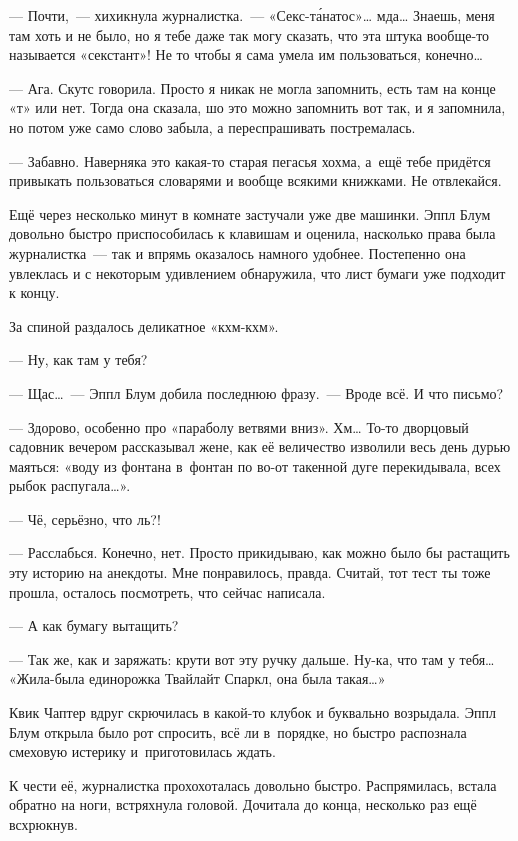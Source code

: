 \documentclass[fontsize=11pt,a5paper,titlepage=firstcover]{scrbook}
\begin{document}
--- Почти,~--- хихикнула журналистка.~--- «Секс-та́натос»{\ldots} мда{\ldots} Знаешь, меня там хоть и не было, но я тебе даже так могу сказать, что эта штука вообще-то называется «секстант»! Не то чтобы я сама умела им пользоваться, конечно{\ldots}

--- Ага. Скутс говорила. Просто я никак не могла запомнить, есть там на конце «т» или нет. Тогда она сказала, шо это можно запомнить вот так, и я запомнила, но потом уже само слово забыла, а переспрашивать постремалась.

--- Забавно. Наверняка это какая-то старая пегасья хохма, а~ещё тебе придётся привыкать пользоваться словарями и вообще всякими книжками. Не отвлекайся.

Ещё через несколько минут в комнате застучали уже две машинки. Эппл Блум довольно быстро приспособилась к клавишам и оценила, насколько права была журналистка~--- так и впрямь оказалось намного удобнее. Постепенно она увлеклась и с некоторым удивлением обнаружила, что лист бумаги уже подходит к концу.

За спиной раздалось деликатное «кхм-кхм».

--- Ну, как там у тебя?

--- Щас{\ldots}~--- Эппл Блум добила последнюю фразу.~--- Вроде всё. И что письмо?

--- Здорово, особенно про «параболу ветвями вниз». Хм{\ldots} То-то дворцовый садовник вечером рассказывал жене, как её величество изволили весь день дурью маяться: «воду из фонтана в~фонтан по во-от такенной дуге перекидывала, всех рыбок распугала{\ldots}».

--- Чё, серьёзно, что ль?!

--- Расслабься. Конечно, нет. Просто прикидываю, как можно было бы растащить эту историю на анекдоты. Мне понравилось, правда. Считай, тот тест ты тоже прошла, осталось посмотреть, что сейчас написала.

--- А как бумагу вытащить?

--- Так же, как и заряжать: крути вот эту ручку дальше. Ну-ка, что там у тебя{\ldots} «Жила-была единорожка Твайлайт Спаркл, она была такая{\ldots}»

Квик Чаптер вдруг скрючилась в какой-то клубок и буквально возрыдала. Эппл Блум открыла было рот спросить, всё ли в~порядке, но быстро распознала смеховую истерику и~приготовилась ждать.

К чести её, журналистка прохохоталась довольно быстро. Распрямилась, встала обратно на ноги, встряхнула головой. Дочитала до конца, несколько раз ещё всхрюкнув.
\end{document}
